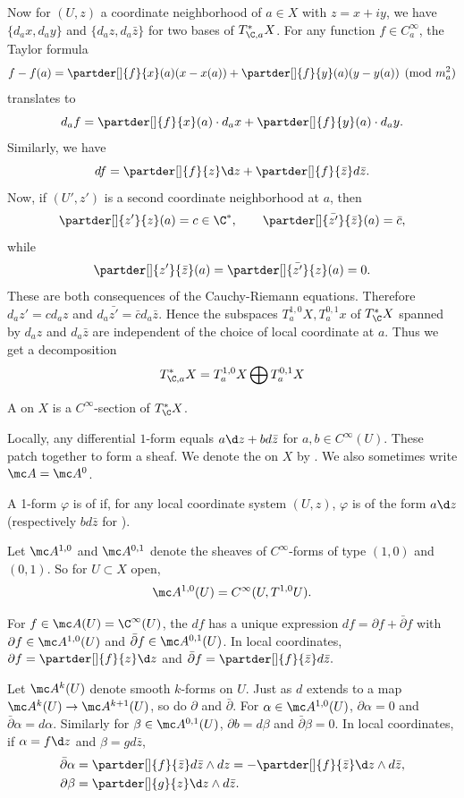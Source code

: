 \documentclass[11pt]{report}
\begin{document}
Now for $(U,z)$ a coordinate neighborhood of $a \in X$ with $z=x+iy$, we have $\{d_ax,d_ay\}$ and $\{d_az,d_a\bar z\}$ for two bases of $T^*_{\C,a}X$. For any function $f \in C_a^\infty$, the Taylor formula
\[
f-f(a)=\partder[]{f}{x}(a)(x-x(a))+\partder[]{f}{y}(a)(y-y(a)) \pmod{m_a^2}
\]
translates to
\[
d_af = \partder[]{f}{x}(a)\cdot d_ax+\partder[]{f}{y}(a)\cdot d_ay.
\]
Similarly, we have
\[
df = \partder[]{f}{z}\d z + \partder[]{f}{\bar z}d \bar z.
\]
Now, if $(U',z')$ is a second coordinate neighborhood at $a$, then
\[
\partder[]{z'}{z}(a)=c \in \C^*, \qquad \partder[] {\bar{z'}}{\bar z}(a)= \bar c,
\]
while
\[
\partder[]{z'}{\bar z}(a)=\partder[]{\bar{z'}}{z}(a)=0.
\]
These are both consequences of the Cauchy-Riemann equations. Therefore $d_az'= cd_az$ and $d_a\bar{z'}=\bar c d_a\bar z$. Hence the subspaces $T_a^{1,0}X,T_a^{0,1}x$ of $T^*_\C X$ spanned by $d_az$ and $d_a \bar z$ are independent of the choice of local coordinate at $a$. Thus we get a decomposition
\[
T^*_{\C,a}X=T_a^{1,0}X \bigoplus T_a^{0,1}X
\]

\begin{defn}
A  on $X$ is a $C^\infty$-section of $T_\C^* X$.

Locally, any differential $1$-form equals $a\d z + bd \bar z$ for $a,b \in C^\infty(U)$. These patch together to form a sheaf. We denote the  on $X$ by . We also sometimes write $\mc A =\mc A^0$.

A 1-form $\varphi$ is of  if, for any local coordinate system $(U,z)$, $\varphi$ is of the form $a\d z$ (respectively $b d \bar z$ for ).

Let $\mc A^{1,0}$ and $\mc A^{0,1}$ denote the sheaves of $C^\infty$-forms of type $(1,0)$ and $(0,1)$. So for $U \subset X$ open,
\[
\mc A^{1,0}(U) = C^\infty (U,T^{1,0}U).
\]
\end{defn}

\begin{defn}
For $f \in \mc A(U)=\C^\infty (U)$, the  $df$ has a unique expression $df = \partial f + \bar \partial f$ with $\partial f \in \mc A^{1,0}(U)$ and $\bar \partial f \in \mc A^{0,1}(U)$. In local coordinates, $\partial f = \partder[]{f}{z}\d z$ and $\bar \partial f = \partder[]{f}{\bar z}d \bar z.$
\end{defn}

\begin{rmk}
Let $\mc A^k(U)$ denote smooth $k$-forms on $U$. Just as $d$ extends to a map $\mc A^k(U) \to \mc A^{k+1}(U)$, so do $\partial$ and $\bar \partial$. For $\alpha \in \mc A^{1,0}(U)$, $\partial \alpha =0$ and $\bar \partial \alpha = d\alpha$. Similarly for $\beta \in \mc A^{0,1}(U)$, $\partial b = d \beta$ and $\bar \partial \beta =0$. In local coordinates, if $\alpha = f\d z$ and $\beta = g d \bar z$,
\begin{align*}
    \bar \partial \alpha &= \partder[]{f}{\bar z}d \bar z \land d z = -\partder[]{f}{\bar z}\d z \land d \bar z, \\
    \partial \beta &= \partder[]{g}{z}\d z \land d \bar z.
\end{align*} 
\end{rmk}
\end{document}
